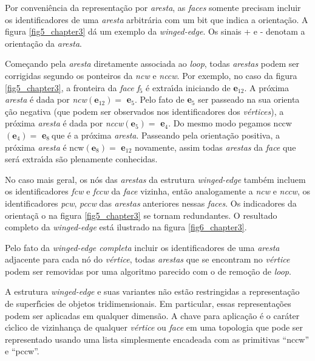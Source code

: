 \documentclass[12pt,a4paper]{book}
\begin{document}
Por conveni\^{e}ncia da representa\c{c}\~{a}o por \textit{aresta}, as \textit{%
faces} somente precisam incluir os identificadores de uma \textit{aresta}
arbitr\'{a}ria com um bit que indica a orienta\c{c}\~{a}o. A figura \ref{fig5_chapter3}
d\'{a} um exemplo da \textit{winged-edge}. Os sinais + e - denotam a
orienta\c{c}\~{a}o da \textit{aresta}.

Come\c{c}ando pela \textit{aresta} diretamente associada ao \textit{loop}, todas \textit{arestas} podem ser corrigidas segundo os ponteiros da \textit{ncw} e \textit{nccw}. Por exemplo, no caso da figura \ref{fig5_chapter3}, a fronteira da \textit{face} \textit{f}$_{5}$ \'{e} extra\'{\i}da iniciando de \textbf{e}$%
_{12}$. A pr\'{o}xima \textit{aresta} \'{e} dada por \textit{ncw}$(%
\mathbf{e}_{12})=$ \textbf{e}$_{5}$. Pelo fato de \textbf{e}$_{5}$ ser passeado na sua orienta%
\c{c}\~{a}o negativa (que podem ser observados nos identificadores dos \textit{%
v\'{e}rtices}), a pr\'{o}xima \textit{aresta} \'{e} dada por \textit{nccw}$(%
\mathbf{e}_{5})=$ \textbf{e}$_{4}$. Do mesmo modo pegamos nccw$(\mathbf{e}%
_{4})=$ \textbf{e}$_{8}\mathbf{\ }$que \'{e} a pr\'{o}xima \textit{aresta}.
Passeando pela orienta\c{c}\~{a}o positiva, a pr\'{o}xima \textit{aresta} \'{e}
ncw$(\mathbf{e}_{8})=$ \textbf{e}$_{12}$ novamente, assim todas \textit{arestas%
} da \textit{face} que ser\'{a} extra\'{\i}da s\~{a}o plenamente conhecidas.

No caso mais geral, os n\'{o}s das \textit{arestas} da estrutura \textit{%
winged-edge} tamb\'{e}m incluem os identificadores \textit{fcw} e \textit{%
fccw }da \textit{face} vizinha, ent\~{a}o analogamente a \textit{ncw} e 
\textit{nccw}, os identificadores \textit{pcw}, \textit{pccw }das \textit{%
arestas} anteriores nessas \textit{faces}. Os indicadores da orienta\c{c}\~{a}%
o na figura \ref{fig5_chapter3} se tornam redundantes. O resultado
completo da \textit{winged-edge} est\'{a} ilustrado na figura \ref{fig6_chapter3}.

Pelo fato da \textit{winged-edge completa} incluir os identificadores de uma 
\textit{aresta} adjacente para cada n\'{o} do \textit{v\'{e}rtice}, todas \textit{arestas} que se encontram no \textit{v\'{e}rtice} podem ser removidas por uma algoritmo parecido com o de remo\c{c}\~{a}o de \textit{loop}.

A estrutura \textit{winged-edge} e suas variantes n\~{a}o est\~{a}o
restringidas a representa\c{c}\~{a}o de superf\'{\i}cies de objetos
tridimensionais. Em particular, essas representa\c{c}\~{o}es podem ser aplicadas em
qualquer dimens\~{a}o. A chave para aplica\c{c}\~{a}o \'{e} o car\'{a}ter c\'{\i}clico de vizinhan\c{c}a de qualquer \textit{v\'{e}rtice} ou \textit{face} em uma topologia que pode ser representado usando uma lista simplesmente encadeada com as primitivas ``nccw'' e ``pccw''.
\end{document}
